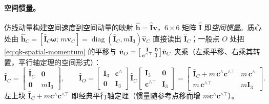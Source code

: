 \paragraph{空间惯量。}
仿线动量构建空间速度到空间动量的映射 $\hat{\boldsymbol{h}}=\hat{\mathbf{I}}\boldsymbol{v}$，$6\times6$ 矩阵 $\hat{\mathbf{I}}$ 即\emph{空间惯量}。质心处由 $\hat{\boldsymbol{h}}_C=[\bar{\mathbf{I}}_C\boldsymbol{\omega};\,m\boldsymbol{v}_C]=\operatorname{diag}(\bar{\mathbf{I}}_C,m\mathbf{I}_3)\hat{\boldsymbol{v}}_C$ 直接读出 $\hat{\mathbf{I}}_C$；一般点 $O$ 处把 \cref{eq:qk-spatial-momentum} 的平移与 $\hat{\boldsymbol{v}}_O={}\begin{bsmallmatrix}\mathbf{I}&\mathbf{0}\\\boldsymbol{c}^{\wedge\top}&\mathbf{I}\end{bsmallmatrix}\hat{\boldsymbol{v}}_C$ 夹乘（左乘平移、右乘其转置，平行轴定理的空间形式）\cite{yu2021quadruped}：
\begin{equation}
  \hat{\mathbf{I}}_C=\begin{bmatrix}\bar{\mathbf{I}}_C&\mathbf{0}\\\mathbf{0}&m\mathbf{I}_3\end{bmatrix},
  \qquad
  \hat{\mathbf{I}}_O=\begin{bmatrix}\mathbf{I}_3&\boldsymbol{c}^{\wedge}\\\mathbf{0}&\mathbf{I}_3\end{bmatrix}\hat{\mathbf{I}}_C\begin{bmatrix}\mathbf{I}_3&\mathbf{0}\\\boldsymbol{c}^{\wedge\top}&\mathbf{I}_3\end{bmatrix}
  =\begin{bmatrix}\bar{\mathbf{I}}_C+m\,\boldsymbol{c}^{\wedge}\boldsymbol{c}^{\wedge\top}&m\,\boldsymbol{c}^{\wedge}\\ m\,\boldsymbol{c}^{\wedge\top}&m\mathbf{I}_3\end{bmatrix}.
  \label{eq:qk-spatial-inertia}
\end{equation}
左上块 $\bar{\mathbf{I}}_C+m\boldsymbol{c}^{\wedge}\boldsymbol{c}^{\wedge\top}$ 即经典平行轴定理（惯量随参考点移而增 $m\boldsymbol{c}^{\wedge}\boldsymbol{c}^{\wedge\top}$）。

